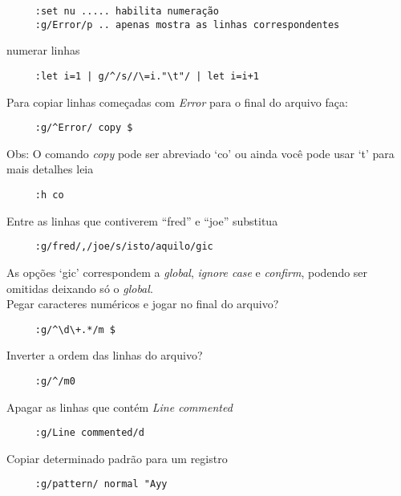 \begin{verbatim}
     :set nu ..... habilita numeração 
     :g/Error/p .. apenas mostra as linhas correspondentes
\end{verbatim}

numerar linhas

\begin{verbatim}
     :let i=1 | g/^/s//\=i."\t"/ | let i=i+1
\end{verbatim}

Para copiar linhas começadas com {\em Error} para o final do arquivo faça:

\begin{verbatim}
     :g/^Error/ copy $
\end{verbatim}

Obs: O comando {\em copy} pode ser abreviado `co' ou ainda você pode usar `t'
para mais detalhes leia

\begin{verbatim}
     :h co
\end{verbatim}

Entre as linhas que contiverem ``fred'' e ``joe'' substitua

\begin{verbatim}
     :g/fred/,/joe/s/isto/aquilo/gic
\end{verbatim}

As opções `gic' correspondem a {\em global}, {\em ignore case} e {\em
confirm}, podendo ser omitidas deixando só o {\em global}. \\


Pegar caracteres numéricos e jogar no final do arquivo?

\begin{verbatim}
     :g/^\d\+.*/m $
\end{verbatim}

Inverter a ordem das linhas do arquivo?

\begin{verbatim}
     :g/^/m0
\end{verbatim}

Apagar as linhas que contém {\em Line commented}

\begin{verbatim}
     :g/Line commented/d
\end{verbatim}

Copiar determinado padrão para um registro

\begin{verbatim}
     :g/pattern/ normal "Ayy
\end{verbatim}

